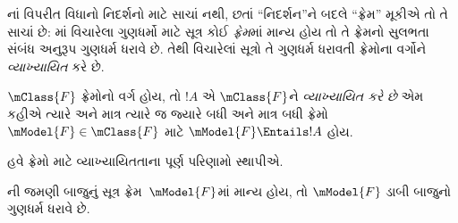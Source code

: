 નાં વિપરીત વિધાનો
નિદર્શનો માટે સાચાં નથી, છતાં ``નિદર્શન''ને બદલે
``ફ્રેમ'' મૂકીએ તો તે સાચાં છે: માં
વિચારેલા ગુણધર્મો માટે સૂત્ર કોઈ \emph{ફ્રેમ}માં
માન્ય હોય તો તે ફ્રેમનો સુલભતા સંબંધ અનુરૂપ
ગુણધર્મ ધરાવે છે. તેથી વિચારેલાં સૂત્રો તે
ગુણધર્મ ધરાવતી ફ્રેમોના વર્ગોને \emph{વ્યાખ્યાયિત}
કરે છે.

\begin{defn}
  $\mClass{F}$ ફ્રેમોનો વર્ગ હોય, તો $!A$ એ
  $\mClass{F}$ને \emph{વ્યાખ્યાયિત કરે છે} એમ કહીએ
  ત્યારે અને માત્ર ત્યારે જ જ્યારે બધી અને માત્ર
  બધી ફ્રેમો~$\mModel{F} \in \mClass{F}$ માટે
  $\mModel{F} \Entails !A$ હોય.
\end{defn}

હવે ફ્રેમો માટે વ્યાખ્યાયિતતાના પૂર્ણ પરિણામો
સ્થાપીએ.

\begin{thm}
ની જમણી બાજુનું સૂત્ર
ફ્રેમ~$\mModel{F}$માં માન્ય હોય, તો $\mModel{F}$
ડાબી બાજુનો ગુણધર્મ ધરાવે છે.
\end{thm}

